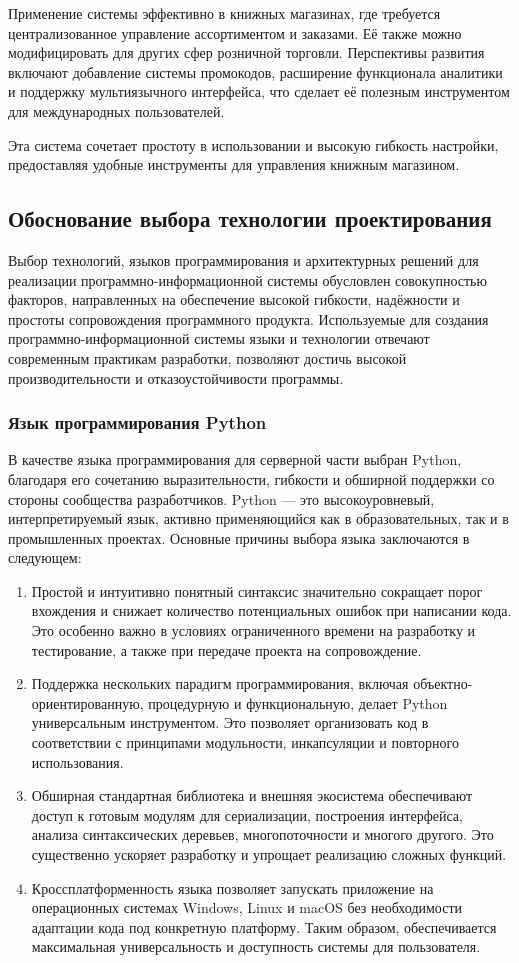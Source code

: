 Применение системы эффективно в книжных магазинах, где требуется централизованное управление ассортиментом и заказами. Её также можно модифицировать для других сфер розничной торговли. Перспективы развития включают добавление системы промокодов, расширение функционала аналитики и поддержку мультиязычного интерфейса, что сделает её полезным инструментом для международных пользователей.

Эта система сочетает простоту в использовании и высокую гибкость настройки, предоставляя удобные инструменты для управления книжным магазином.

\subsection{Обоснование выбора технологии проектирования}

Выбор технологий, языков программирования и архитектурных решений для реализации программно-информационной системы обусловлен совокупностью факторов, направленных на обеспечение высокой гибкости, надёжности и простоты сопровождения программного продукта. Используемые для создания программно-информационной системы языки и технологии отвечают современным практикам разработки, позволяют достичь высокой производительности и отказоустойчивости программы.

\subsubsection{Язык программирования Python}

В качестве языка программирования для серверной части выбран Python, благодаря его сочетанию выразительности, гибкости и обширной поддержки со стороны сообщества разработчиков. Python — это высокоуровневый, интерпретируемый язык, активно применяющийся как в образовательных, так и в промышленных проектах. Основные причины выбора языка заключаются в следующем:
\begin{enumerate}
	\item Простой и интуитивно понятный синтаксис значительно сокращает порог вхождения и снижает количество потенциальных ошибок при написании кода. Это особенно важно в условиях ограниченного времени на разработку и тестирование, а также при передаче проекта на сопровождение.
	\item Поддержка нескольких парадигм программирования, включая объектно-ориентированную, процедурную и функциональную, делает Python универсальным инструментом. Это позволяет организовать код в соответствии с принципами модульности, инкапсуляции и повторного использования.
	\item Обширная стандартная библиотека и внешняя экосистема обеспечивают доступ к готовым модулям для сериализации, построения интерфейса, анализа синтаксических деревьев, многопоточности и многого другого. Это существенно ускоряет разработку и упрощает реализацию сложных функций.
	\item Кроссплатформенность языка позволяет запускать приложение на операционных системах Windows, Linux и macOS без необходимости адаптации кода под конкретную платформу. Таким образом, обеспечивается максимальная универсальность и доступность системы для пользователя.	
\end{enumerate}


